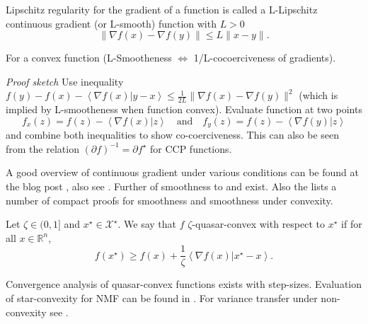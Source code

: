 \documentclass{article}
\newcommand{\innerp}[2]{\left\langle #1 \vert #2 \right\rangle}
\begin{document}
\begin{definition}[label=ceh4aors, name=L-Smooth ({\textit or L-Lipschitz Continuous Gradient})]
	Lipschitz regularity for the gradient of a function is called a 
	L-Lipschitz continuous gradient (or L-smooth) function with \( L > 0\)
	\[
		\lVert\nabla f(x) - \nabla f(y)\rVert\leq L\lVert x - y\rVert.
	\]

	\begin{remark}[label=5vsiv5i2, name=Cocoerciveness of L-Smooth functions]
		For a convex function (L-Smootheness \( \Longleftrightarrow \)
		1/L-cocoerciveness of gradients).

		\textit{Proof sketch} Use inequality \(f(y)-f(x)-\innerp{\nabla
		f(x)}{y-x} \leq \frac{1}{2L}\lVert\nabla f(x) - \nabla
		f(y)\rVert^2\) (which is implied by L-smootheness when function
		convex). Evaluate function at two points
		\[
			f_x(z)= f(z) - \innerp{\nabla f(x)}{z} \quad \text{and}
			\quad f_y(z) = f(z) - \innerp{\nabla f(y)}{z}
		\]
		and combine both inequalities to show co-coerciveness. This can
		also be seen from the relation \( (\partial f)^{-1} = \partial f^\star\)
		for CCP functions.
	\end{remark}

	\begin{literature}[label=2tz2l_0t]
		A good overview of continuous gradient under various conditions can be found at the blog post \cite{zhou_continuous_gradient}, also see \cite[Appendix A][theorem.A.1.1]{acceleration_methods}. Further \cite[connections][theorem.3.4]{structured_nonconvex_functions} of smoothness to \cite[expected-smoothness][equation.3.13]{structured_nonconvex_functions} and \cite[expected residual][assumption.3.1]{structured_nonconvex_functions} exist. Also the \cite[Section 2.5][subsection.2.5]{garrigos2023handbook} lists a number of compact proofs for smoothness and smoothness under convexity.

	\end{literature}
\end{definition}
\begin{definition}[label=3m5jm_az, name=Quasar Convex]
	Let \( \zeta\in(0,1] \) and \( x^\star\in\mathcal X^\star\). We say that \( f \) \( \zeta \)-quasar-convex with respect to \( x^\star \) if for all \( x\in\mathbb R^n \),
	\[
		f(x^\star) \geq f(x) + \frac{1}{\zeta}\innerp{\nabla f(x)}{x^\star - x}.
	\]

	\begin{literature}[label=c9swuw97]
		Convergence analysis of quasar-convex functions exists with \cite[constant and decreasing][subsection.4.1]{structured_nonconvex_functions} step-sizes. Evaluation of star-convexity for NMF can be found in \cite{star_convexity_nmf}. For variance transfer under non-convexity see \cite[Example 2.2][example.2.2]{sgd_arbitrary_sampling}.
	\end{literature}
\end{definition}
\end{document}
